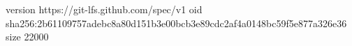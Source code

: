 version https://git-lfs.github.com/spec/v1
oid sha256:2b61109757adebc8a80d151b3e00bcb3e89cdc2af4a0148bc59f5e877a326e36
size 22000

